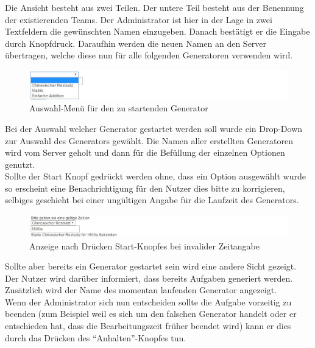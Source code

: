 Die Ansicht besteht aus zwei Teilen. Der untere Teil besteht aus der Benennung der existierenden Teams. Der Administrator ist hier in der Lage in zwei Textfeldern die gewünschten Namen einzugeben. Danach bestätigt er die Eingabe durch Knopfdruck. Daraufhin werden die neuen Namen an den Server übertragen, welche diese nun für alle folgenden Generatoren verwenden wird. \\

\begin{figure}[htp]     %
\centering
\includegraphics[width=1\textwidth]{bilder/StartDropDown} 
\caption[Auswahl-Menü für den zu startenden Generator]{Auswahl-Menü für den zu startenden Generator}
\end{figure} 

Bei der Auswahl welcher Generator gestartet werden soll wurde ein Drop-Down zur Auswahl des Generators gewählt. Die Namen aller erstellten Generatoren wird vom Server geholt und dann für die Befüllung der einzelnen Optionen genutzt.\\
Sollte der Start Knopf gedrückt werden ohne, dass ein Option ausgewählt wurde so erscheint eine Benachrichtigung für den Nutzer dies bitte zu korrigieren, selbiges geschieht bei einer ungültigen Angabe für die Laufzeit des Generators. \\

\begin{figure}[htp]     %
\centering
\includegraphics[width=1\textwidth]{bilder/InvalidTime} 
\caption[Anzeige nach Drücken Start-Knopfes bei invalider Zeitangabe]{Anzeige nach Drücken Start-Knopfes bei invalider Zeitangabe}
\end{figure} 
 

Sollte aber bereits ein Generator gestartet sein wird eine andere Sicht gezeigt. Der Nutzer wird darüber informiert, dass bereits Aufgaben generiert werden. Zusätzlich wird der Name des momentan laufenden Generator angezeigt.\\
Wenn der Administrator sich nun entscheiden sollte die Aufgabe vorzeitig zu beenden (zum Beispiel weil es sich um den falschen Generator handelt oder er entschieden hat, dass die Bearbeitungszeit früher beendet wird) kann er dies durch das Drücken des ``Anhalten''-Knopfes tun.


